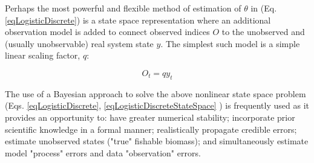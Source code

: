 \documentclass[letterpaper,portrait,11pt]{scrartcl}
\numberwithin{equation}{section}		%
\numberwithin{figure}{section}		%
\numberwithin{table}{section}				%
\begin{document}
Perhaps the most powerful and flexible method of estimation of $\theta$ in (Eq. \ref{eqLogisticDiscrete}) is a state space representation where an additional observation model is added to connect observed indices $O$ to the unobserved and (usually unobservable) real system state $y$. The simplest such model is a simple linear scaling factor, $q$: 

\begin{equation} 
\label{eqLogisticDiscreteStateSpace}
O_t = q y_t
\end{equation}


The use of a Bayesian approach to solve the above nonlinear state space problem (Eqs. \ref{eqLogisticDiscrete}, \ref{eqLogisticDiscreteStateSpace} ) is frequently used as it provides an opportunity to: have greater numerical stability;  incorporate prior scientific knowledge in a formal manner; realistically propagate credible errors; estimate unobserved states ("true" fishable biomass); and simultaneously estimate model "process" errors and data "observation" errors. 
\end{document}

